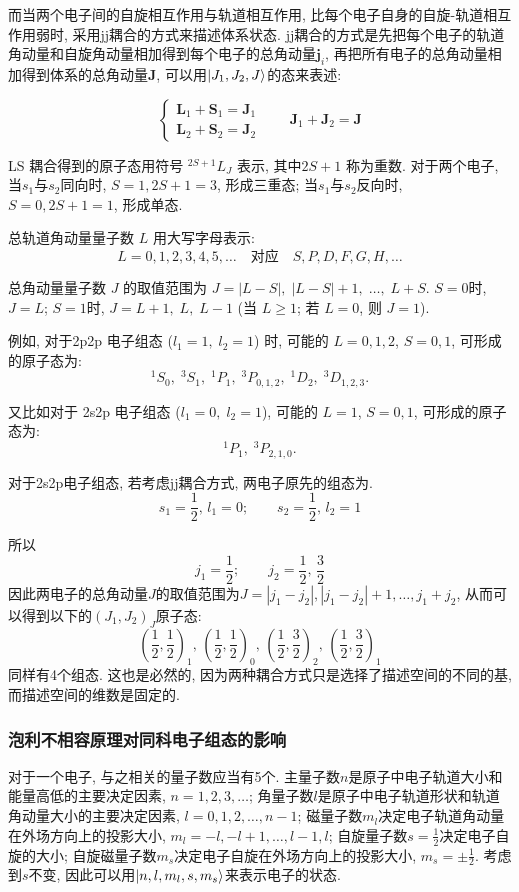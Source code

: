 而当两个电子间的自旋相互作用与轨道相互作用, 比每个电子自身的自旋-轨道相互作用弱时, 采用jj耦合的方式来描述体系状态. jj耦合的方式是先把每个电子的轨道角动量和自旋角动量相加得到每个电子的总角动量$\bm{j}_i$, 再把所有电子的总角动量相加得到体系的总角动量$\bm{J}$, 可以用$\ket{J_1, J_2, J}$的态来表述:

\[\begin{cases} \bm{L}_1 + \bm{S}_1 = \bm{J}_1 \\ \bm{L}_2 + \bm{S}_2 = \bm{J}_2 \end{cases}\qquad \bm{J}_1 + \bm{J}_2 = \bm{J}\]

LS 耦合得到的原子态用符号 \(^{2S+1}L_J\) 表示, 其中\(2S+1\) 称为重数. 对于两个电子, 当$s_1$与$s_2$同向时, $S=1, 2S+1=3$, 形成三重态; 当$s_1$与$s_2$反向时, $S=0, 2S+1=1$, 形成单态.

总轨道角动量量子数 \(L\) 用大写字母表示:
    \[
    L = 0, 1, 2, 3, 4, 5, \dots \quad\text{对应}\quad S, P, D, F, G, H, \dots
    \]

总角动量量子数 \(J\) 的取值范围为 \(J = |L-S|, \;|L-S|+1, \;\dots, \;L+S\). $S=0$时, $J=L$; $S=1$时, $J=L+1, \;L, \;L-1$ (当 $L \ge 1$; 若 $L=0$, 则 $J=1$).

例如, 对于2p2p 电子组态 (\(l_1=1, \;l_2=1\)) 时, 可能的 \(L=0, 1, 2\), \(S=0, 1\), 可形成的原子态为:
\[
^1S_0, \; ^3S_1, \; ^1P_1, \; ^3P_{0, 1, 2}, \; ^1D_2, \; ^3D_{1, 2, 3}.
\]

又比如对于 2s2p 电子组态 (\(l_1=0, \;l_2=1\)), 可能的 \(L=1\), \(S=0, 1\), 可形成的原子态为:
\[
^1P_1, \; ^3P_{2, 1, 0}.
\]

对于2s2p电子组态, 若考虑jj耦合方式, 两电子原先的组态为.
\[
s_1 = \frac{1}{2}, \, l_1 = 0; \qquad s_2 = \frac{1}{2}, \, l_2 = 1
\]

所以
\[
j_1 = \frac{1}{2}; \qquad j_2 = \frac{1}{2}, \, \frac{3}{2}
\]
因此两电子的总角动量$J$的取值范围为$J = |j_1-j_2|, |j_1-j_2|+1, \ldots, j_1+j_2$, 从而可以得到以下的$(J_1, J_2)_{J}$原子态:
\[
\left( \frac{1}{2}, \frac{1}{2} \right)_1, \, \left( \frac{1}{2}, \frac{1}{2} \right)_0, \, \left( \frac{1}{2}, \frac{3}{2} \right)_2, \, \left( \frac{1}{2}, \frac{3}{2} \right)_1
\]
同样有4个组态. 这也是必然的, 因为两种耦合方式只是选择了描述空间的不同的基, 而描述空间的维数是固定的.

\subsubsection{泡利不相容原理对同科电子组态的影响}
对于一个电子, 与之相关的量子数应当有5个. 主量子数$n$是原子中电子轨道大小和能量高低的主要决定因素, $n=1, 2, 3, \ldots$; 角量子数$l$是原子中电子轨道形状和轨道角动量大小的主要决定因素, $l=0, 1, 2, \ldots, n-1$; 磁量子数$m_l$决定电子轨道角动量在外场方向上的投影大小, $m_l = -l, -l+1, \ldots, l-1, l$; 自旋量子数$s=\frac{1}{2}$决定电子自旋的大小; 自旋磁量子数$m_s$决定电子自旋在外场方向上的投影大小, $m_s = \pm \frac{1}{2}$. 考虑到$s$不变, 因此可以用$\ket{n, l, m_l, s, m_s}$来表示电子的状态.

